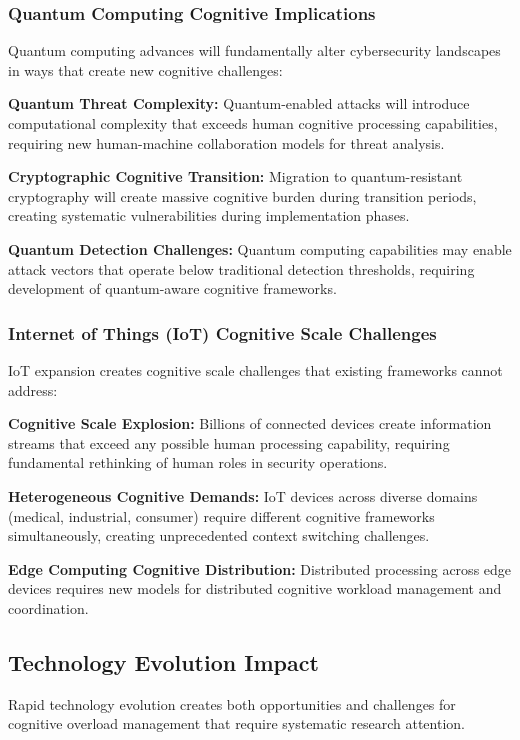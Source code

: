 \documentclass[11pt,a4paper]{article}
\begin{document}
\subsubsection{Quantum Computing Cognitive Implications}

Quantum computing advances will fundamentally alter cybersecurity landscapes in ways that create new cognitive challenges:

\textbf{Quantum Threat Complexity:} Quantum-enabled attacks will introduce computational complexity that exceeds human cognitive processing capabilities, requiring new human-machine collaboration models for threat analysis.

\textbf{Cryptographic Cognitive Transition:} Migration to quantum-resistant cryptography will create massive cognitive burden during transition periods, creating systematic vulnerabilities during implementation phases.

\textbf{Quantum Detection Challenges:} Quantum computing capabilities may enable attack vectors that operate below traditional detection thresholds, requiring development of quantum-aware cognitive frameworks.

\subsubsection{Internet of Things (IoT) Cognitive Scale Challenges}

IoT expansion creates cognitive scale challenges that existing frameworks cannot address:

\textbf{Cognitive Scale Explosion:} Billions of connected devices create information streams that exceed any possible human processing capability, requiring fundamental rethinking of human roles in security operations.

\textbf{Heterogeneous Cognitive Demands:} IoT devices across diverse domains (medical, industrial, consumer) require different cognitive frameworks simultaneously, creating unprecedented context switching challenges.

\textbf{Edge Computing Cognitive Distribution:} Distributed processing across edge devices requires new models for distributed cognitive workload management and coordination.

\subsection{Technology Evolution Impact}

Rapid technology evolution creates both opportunities and challenges for cognitive overload management that require systematic research attention.
\end{document}
